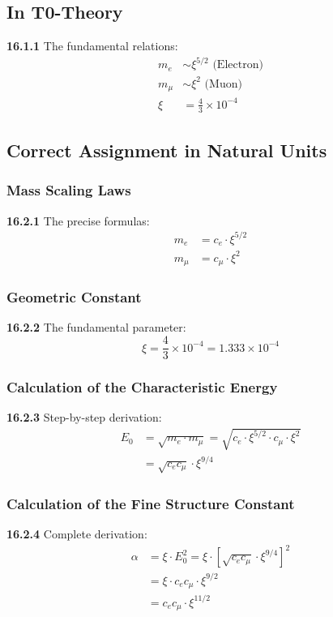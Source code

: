 \documentclass[12pt,a4paper]{article}
\newcommand{\xipar}{\xi}
\begin{document}
\subsection{In T0-Theory}

\noindent \textbf{16.1.1} The fundamental relations:
\begin{align}
	m_e &\sim \xi^{5/2} \text{ (Electron)} \\
	m_\mu &\sim \xi^2 \text{ (Muon)} \\
	\xi &= \frac{4}{3} \times 10^{-4} 
\end{align}

\subsection{Correct Assignment in Natural Units}

\subsubsection{Mass Scaling Laws}
\noindent \textbf{16.2.1} The precise formulas:
\begin{align}
	m_e &= c_e \cdot \xipar^{5/2} \\
	m_\mu &= c_\mu \cdot \xipar^2
\end{align}

\subsubsection{Geometric Constant}
\noindent \textbf{16.2.2} The fundamental parameter:
\begin{equation}
	\xipar = \frac{4}{3} \times 10^{-4} = 1.333 \times 10^{-4}
\end{equation}

\subsubsection{Calculation of the Characteristic Energy}
\noindent \textbf{16.2.3} Step-by-step derivation:
\begin{align}
	E_0 &= \sqrt{m_e \cdot m_\mu} = \sqrt{c_e \cdot \xipar^{5/2} \cdot c_\mu \cdot \xipar^2} \\
	&= \sqrt{c_e c_\mu} \cdot \xipar^{9/4}
\end{align}

\subsubsection{Calculation of the Fine Structure Constant}
\noindent \textbf{16.2.4} Complete derivation:
\begin{align}
	\alpha &= \xipar \cdot E_0^2 = \xipar \cdot \left[ \sqrt{c_e c_\mu} \cdot \xipar^{9/4} \right]^2 \\
	&= \xipar \cdot c_e c_\mu \cdot \xipar^{9/2} \\
	&= c_e c_\mu \cdot \xipar^{11/2}
\end{align}
\end{document}
